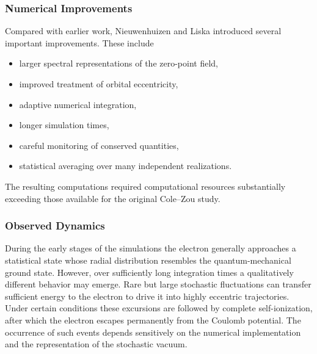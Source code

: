 \subsubsection{Numerical Improvements}
Compared with earlier work, Nieuwenhuizen and Liska introduced several
important improvements.
These include
\begin{itemize}
\item
larger spectral representations of the zero-point field,
\item
improved treatment of orbital eccentricity,
\item
adaptive numerical integration,
\item
longer simulation times,
\item
careful monitoring of conserved quantities,
\item
statistical averaging over many independent realizations.
\end{itemize}
The resulting computations required computational resources
substantially exceeding those available for the original Cole--Zou
study.
\subsubsection{Observed Dynamics}
During the early stages of the simulations the electron generally
approaches a statistical state whose radial distribution resembles the
quantum-mechanical ground state.
However, over sufficiently long integration times a qualitatively
different behavior may emerge.
Rare but large stochastic fluctuations can transfer sufficient energy
to the electron to drive it into highly eccentric trajectories. Under
certain conditions these excursions are followed by complete
self-ionization, after which the electron escapes permanently from the
Coulomb potential.
The occurrence of such events depends sensitively on the numerical
implementation and the representation of the stochastic vacuum.
